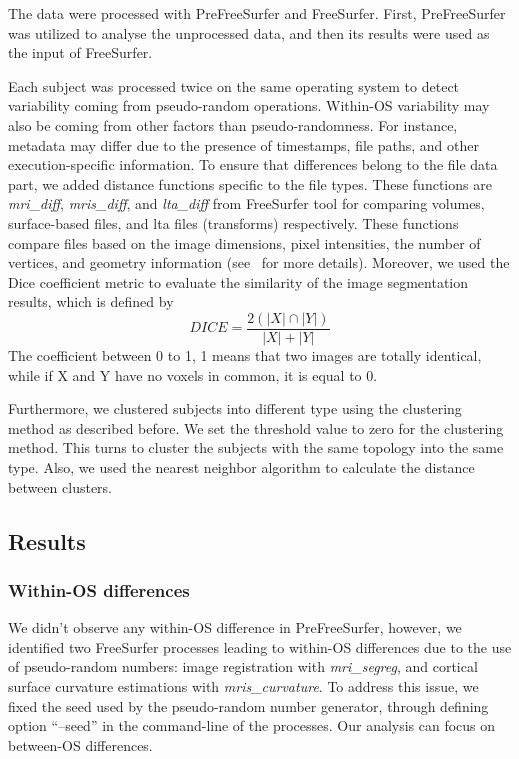 \documentclass[a4paper,num-refs]{oup-contemporary}
\begin{document}
The data were processed with PreFreeSurfer and FreeSurfer. 
First, PreFreeSurfer was utilized to analyse the unprocessed data, and then its 
results were used as the input of FreeSurfer.

Each subject was processed twice on the same operating system to detect
variability coming from pseudo-random operations. 
Within-OS variability may also be coming from other factors than pseudo-randomness. 
For instance, metadata may differ due to the presence of timestamps, 
file paths, and other execution-specific information. 
To ensure that differences belong to the file data part, 
we added distance functions specific to the file types.
These functions are \emph{mri\_diff}, \emph{mris\_diff}, and \emph{lta\_diff} 
from FreeSurfer tool for comparing volumes, surface-based files, 
and lta files (transforms) respectively. 
These functions compare files based on the image dimensions, 
pixel intensities, the number of vertices, and geometry information
(see~\cite{fischl2012freesurfer} for more details). 
Moreover, we used the Dice coefficient metric to evaluate the similarity of 
the image segmentation results, which is defined by
\[DICE=\frac{2(|X|\cap|Y|)}{|X|+|Y|}\]
The coefficient between 0 to 1, 1 means that two images are totally identical, while if 
X and Y have no voxels in common, it is equal to 0. 

Furthermore, we clustered subjects into different type using 
the clustering method as described before.
We set the threshold value to zero for the clustering method. 
This turns to cluster the subjects with the same topology into the same type.
Also, we used the nearest neighbor algorithm to calculate the distance between clusters.


\subsection{Results}

\subsubsection{Within-OS differences}

We didn't observe any within-OS difference in PreFreeSurfer, however, we
identified two FreeSurfer processes leading to within-OS differences due
to the use of pseudo-random numbers: image registration with
\emph{mri\_segreg}, and cortical surface curvature
estimations with \emph{mris\_curvature}. To address this issue, we fixed
the seed used by the pseudo-random number generator, through defining 
option ``--seed'' in the command-line of the processes.
Our analysis can focus on between-OS differences. 
\end{document}
